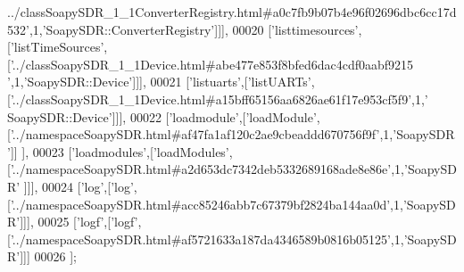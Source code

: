 \begin{DoxyCode}
{      ../classSoapySDR\_1\_1ConverterRegistry.html#a0c7fb9b07b4e96f02696dbc6cc17d532'},1,\textcolor{stringliteral}{'SoapySDR::ConverterRegistry'}]]],
00020   [\textcolor{stringliteral}{'listtimesources'},[\textcolor{stringliteral}{'listTimeSources'},[\textcolor{stringliteral}{'../classSoapySDR\_1\_1Device.html#abe477e853f8bfed6dac4cdf0aabf9215
      '},1,\textcolor{stringliteral}{'SoapySDR::Device'}]]],
00021   [\textcolor{stringliteral}{'listuarts'},[\textcolor{stringliteral}{'listUARTs'},[\textcolor{stringliteral}{'../classSoapySDR\_1\_1Device.html#a15bff65156aa6826ae61f17e953cf5f9'},1,\textcolor{stringliteral}{'
      SoapySDR::Device'}]]],
00022   [\textcolor{stringliteral}{'loadmodule'},[\textcolor{stringliteral}{'loadModule'},[\textcolor{stringliteral}{'../namespaceSoapySDR.html#af47fa1af120c2ae9cbeaddd670756f9f'},1,\textcolor{stringliteral}{'SoapySDR'}]]
      ],
00023   [\textcolor{stringliteral}{'loadmodules'},[\textcolor{stringliteral}{'loadModules'},[\textcolor{stringliteral}{'../namespaceSoapySDR.html#a2d653dc7342deb5332689168ade8e86e'},1,\textcolor{stringliteral}{'SoapySDR'}
      ]]],
00024   [\textcolor{stringliteral}{'log'},[\textcolor{stringliteral}{'log'},[\textcolor{stringliteral}{'../namespaceSoapySDR.html#acc85246abb7c67379bf2824ba144aa0d'},1,\textcolor{stringliteral}{'SoapySDR'}]]],
00025   [\textcolor{stringliteral}{'logf'},[\textcolor{stringliteral}{'logf'},[\textcolor{stringliteral}{'../namespaceSoapySDR.html#af5721633a187da4346589b0816b05125'},1,\textcolor{stringliteral}{'SoapySDR'}]]]
00026 ];
\end{DoxyCode}
